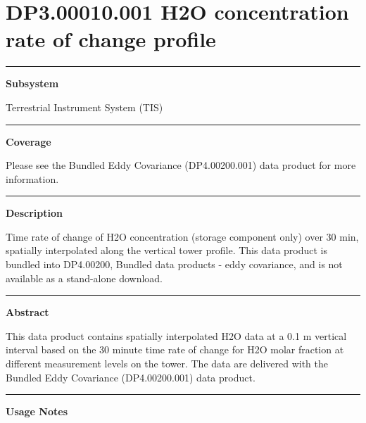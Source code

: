 \documentclass[]{article}
\begin{document}
\section{DP3.00010.001 H2O concentration rate of change
profile}\label{dp3.00010.001-h2o-concentration-rate-of-change-profile}

\begin{center}\rule{0.5\linewidth}{\linethickness}\end{center}

\textbf{Subsystem}

Terrestrial Instrument System (TIS)

\begin{center}\rule{0.5\linewidth}{\linethickness}\end{center}

\textbf{Coverage}

Please see the Bundled Eddy Covariance (DP4.00200.001) data product for
more information.

\begin{center}\rule{0.5\linewidth}{\linethickness}\end{center}

\textbf{Description}

Time rate of change of H2O concentration (storage component only) over
30 min, spatially interpolated along the vertical tower profile. This
data product is bundled into DP4.00200, Bundled data products - eddy
covariance, and is not available as a stand-alone download.

\begin{center}\rule{0.5\linewidth}{\linethickness}\end{center}

\textbf{Abstract}

This data product contains spatially interpolated H2O data at a 0.1 m
vertical interval based on the 30 minute time rate of change for H2O
molar fraction at different measurement levels on the tower. The data
are delivered with the Bundled Eddy Covariance (DP4.00200.001) data
product.

\begin{center}\rule{0.5\linewidth}{\linethickness}\end{center}

\textbf{Usage Notes}
\end{document}
